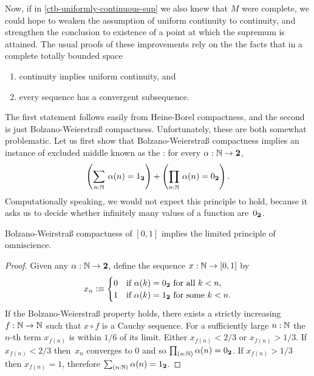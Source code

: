 Now, if in \autoref{ctb-uniformly-continuous-sup} we also knew that $M$ were complete, we
could hope to weaken the assumption of uniform continuity to continuity, and strengthen
the conclusion to existence of a point at which the supremum is attained. The usual proofs
of these improvements rely on the the facts that in a complete totally bounded space
%
\begin{enumerate}
\item continuity implies uniform continuity, and
\item every sequence has a convergent subsequence.
\end{enumerate}
%
The first statement follows easily from Heine-Borel compactness, and the second is just
Bolzano-Weierstra\ss{} compactness. Unfortunately, these are both somewhat problematic. Let
us first show that Bolzano-Weierstra\ss{} compactness implies an instance of excluded middle
known as the : for every $\alpha : \mathbb{N} \to
\mathbf{2}$,
% 
\begin{equation} \label{eq:lpo}
  \left(\sm{n : \N} \alpha(n) = \btrue\right) +
  \left(\prd{n : \N} \alpha(n) = \bfalse\right).
\end{equation}
%
Computationally speaking, we would not expect this principle to hold, because it asks us to decide
whether infinitely many values of a function are~${0_{\mathbf{2}}}$.
  
\begin{thm} \label{analysis-bw-lpo}
  Bolzano-Weirstra\ss{} compactness of $[0,1]$ implies the limited principle of omniscience.
\end{thm}

\begin{proof}
  Given any $\alpha : \mathbb{N} \to \mathbf{2}$, define the sequence $x : \mathbb{N} \to [0,1]$ by
  \begin{equation*}
    x_n \vcentcolon\equiv
    \begin{cases}
      0 & \text{if $\alpha(k) = {0_{\mathbf{2}}}$ for all $k < n$,}\\
      1 & \text{if $\alpha(k) = {1_{\mathbf{2}}}$ for some $k < n$}.
    \end{cases}
  \end{equation*}
  If the Bolzano-Weierstra\ss{} property holds, there exists a strictly increasing $f : \mathbb{N} \to
  \mathbb{N}$ such that $x \circ f$ is a Cauchy sequence. For a sufficiently large $n :
  \mathbb{N}$ the $n$-th term $x_{f(n)}$ is within $1/6$ of its limit. Either $x_{f(n)} < 2/3$ or
  $x_{f(n)} > 1/3$. If $x_{f(n)} < 2/3$ then~$x_n$ converges to $0$ and so $\prd{n : \N}
  \alpha(n) = \bfalse$. If $x_{f(n)} > 1/3$ then $x_{f(n)} = 1$, therefore $\sm{n : \N}
  \alpha(n) = \btrue$.
\end{proof}

